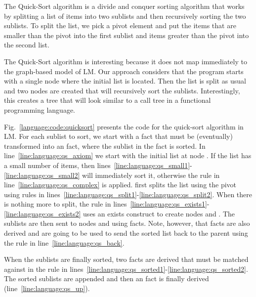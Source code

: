 The Quick-Sort algorithm is a divide and conquer sorting algorithm that works by
splitting a list of items into two sublists and then recursively sorting the two
sublists. To split the list, we pick a pivot element and put the items that are
smaller than the pivot into the first sublist and items greater than the pivot
into the second list.

The Quick-Sort algorithm is interesting because it does not map immediately to
the graph-based model of LM. Our approach considers that the program starts with
a single node where the initial list is located. Then the list is split as usual
and two nodes are created that will recursively sort the sublists.
Interestingly, this creates a tree that will look similar to a call tree in a
functional programming language.

Fig.~\ref{language:code:quicksort} presents the code for the quick-sort
algorithm in LM. For each sublist to sort, we start with a  fact
that must be (eventually) transformed into an  fact, where the
sublist in the  fact is sorted.  In line~\ref{line:language:qs_axiom}
we start with the initial list at node . If the list has a small
number of items, then
lines~\ref{line:language:qs_small1}-\ref{line:language:qs_small2} will
immediately sort it, otherwise the rule in line~\ref{line:language:qs_complex} is applied.  
first splits the list using the pivot  using rules in
lines~\ref{line:language:qs_split1}-\ref{line:language:qs_split2}.
When there is nothing more to split, the rule in
lines~\ref{line:language:qs_exists1}-\ref{line:language:qs_exists2} uses an
exists construct to create nodes  and . The sublists are
then sent to nodes  and  using  facts.  Note,
however, that  facts are also derived and are going to be used to
send the sorted list back to the parent using the rule in
line~\ref{line:language:qs_back}.

When the sublists are finally sorted, two  facts are derived that
must be matched against  in the rule in
lines~\ref{line:language:qs_sorted1}-\ref{line:language:qs_sorted2}. The sorted
sublists are appended and then an  fact is finally derived
(line~\ref{line:language:qs_up}).

